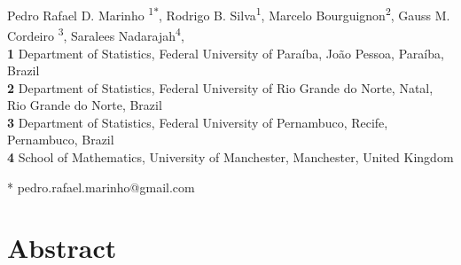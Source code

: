 \documentclass[10pt,letterpaper]{article}
\begin{document}
\vspace*{0.2in}

\begin{flushleft}
{\Large
\textbf{}}
\newline \vspace{0.3cm}

Pedro Rafael D. Marinho \textsuperscript{1${*}$},
Rodrigo B. Silva\textsuperscript{1},
Marcelo Bourguignon\textsuperscript{2},
Gauss M. Cordeiro \textsuperscript{3},
Saralees Nadarajah\textsuperscript{4},
\\
\bigskip
\textbf{1} Department of Statistics, Federal University of Para\'{i}ba, João Pessoa, Paraíba, Brazil
\\
\textbf{2} Department of Statistics, Federal University of Rio Grande do Norte, Natal, Rio Grande do Norte, Brazil
\\
\textbf{3} Department of Statistics, Federal University of Pernambuco, Recife, Pernambuco, Brazil
\\
\textbf{4} School of Mathematics, University of Manchester, Manchester, United Kingdom
\bigskip

* pedro.rafael.marinho@gmail.com

\end{flushleft}

\section*{Abstract}
\end{document}
